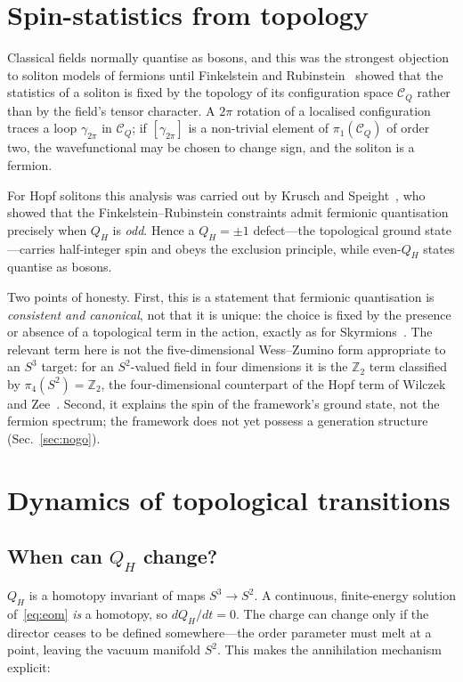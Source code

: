 \documentclass[aps,prd,preprint,nofootinbib,longbibliography]{revtex4-2}
\newcommand{\Qh}{Q_H}
\begin{document}
\section{Spin-statistics from topology}
\label{sec:spin}

Classical fields normally quantise as bosons, and this was the strongest
objection to soliton models of fermions until Finkelstein and
Rubinstein~\cite{finkelstein1968} showed that the statistics of a soliton is
fixed by the topology of its configuration space $\mathcal{C}_Q$ rather than by
the field's tensor character. A $2\pi$ rotation of a localised configuration
traces a loop $\gamma_{2\pi}$ in $\mathcal{C}_Q$; if $[\gamma_{2\pi}]$ is a
non-trivial element of $\pi_1(\mathcal{C}_Q)$ of order two, the wavefunctional may
be chosen to change sign, and the soliton is a fermion.

For Hopf solitons this analysis was carried out by Krusch and
Speight~\cite{krusch2006}, who showed that the Finkelstein--Rubinstein
constraints admit fermionic quantisation precisely when $\Qh$ is \emph{odd}.
Hence a $\Qh=\pm1$ defect---the topological ground state---carries half-integer
spin and obeys the exclusion principle, while even-$\Qh$ states quantise as
bosons.

Two points of honesty. First, this is a statement that fermionic quantisation is
\emph{consistent and canonical}, not that it is unique: the choice is fixed by the
presence or absence of a topological term in the action, exactly as for
Skyrmions~\cite{witten1983}. The relevant term here is not the five-dimensional
Wess--Zumino form appropriate to an $S^3$ target: for an $S^2$-valued field in
four dimensions it is the $\mathbb{Z}_2$ term classified by
$\pi_4(S^2)=\mathbb{Z}_2$, the four-dimensional counterpart of the Hopf term of
Wilczek and Zee~\cite{wilczekzee1983}. Second, it explains the spin of the
framework's ground state, not the fermion spectrum; the framework does not yet
possess a generation structure (Sec.~\ref{sec:nogo}).

\section{Dynamics of topological transitions}
\label{sec:dynamics}

\subsection{When can $\Qh$ change?}

$\Qh$ is a homotopy invariant of maps $S^3\to S^2$. A continuous, finite-energy
solution of~\eqref{eq:eom} \emph{is} a homotopy, so $d\Qh/dt=0$. The charge can
change only if the director ceases to be defined somewhere---the order parameter
must melt at a point, leaving the vacuum manifold $S^2$. This makes the
annihilation mechanism explicit:
\end{document}
